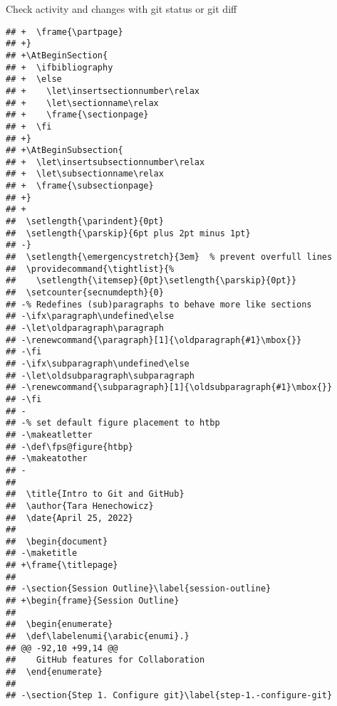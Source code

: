 \documentclass[ignorenonframetext,]{beamer}
\newif\ifbibliography
\let\insertsectionnumber\relax
\let\sectionname\relax
\let\insertsubsectionnumber\relax
\let\subsectionname\relax
\providecommand{\tightlist}{%
  \setlength{\itemsep}{0pt}\setlength{\parskip}{0pt}}
\begin{document}
\begin{frame}[fragile]{Check activity and changes with git status or git
diff}
\begin{verbatim}
## +  \frame{\partpage}
## +}
## +\AtBeginSection{
## +  \ifbibliography
## +  \else
## +    \let\insertsectionnumber\relax
## +    \let\sectionname\relax
## +    \frame{\sectionpage}
## +  \fi
## +}
## +\AtBeginSubsection{
## +  \let\insertsubsectionnumber\relax
## +  \let\subsectionname\relax
## +  \frame{\subsectionpage}
## +}
## +
##  \setlength{\parindent}{0pt}
##  \setlength{\parskip}{6pt plus 2pt minus 1pt}
## -}
##  \setlength{\emergencystretch}{3em}  % prevent overfull lines
##  \providecommand{\tightlist}{%
##    \setlength{\itemsep}{0pt}\setlength{\parskip}{0pt}}
##  \setcounter{secnumdepth}{0}
## -% Redefines (sub)paragraphs to behave more like sections
## -\ifx\paragraph\undefined\else
## -\let\oldparagraph\paragraph
## -\renewcommand{\paragraph}[1]{\oldparagraph{#1}\mbox{}}
## -\fi
## -\ifx\subparagraph\undefined\else
## -\let\oldsubparagraph\subparagraph
## -\renewcommand{\subparagraph}[1]{\oldsubparagraph{#1}\mbox{}}
## -\fi
## -
## -% set default figure placement to htbp
## -\makeatletter
## -\def\fps@figure{htbp}
## -\makeatother
## -
##  
##  \title{Intro to Git and GitHub}
##  \author{Tara Henechowicz}
##  \date{April 25, 2022}
##  
##  \begin{document}
## -\maketitle
## +\frame{\titlepage}
##  
## -\section{Session Outline}\label{session-outline}
## +\begin{frame}{Session Outline}
##  
##  \begin{enumerate}
##  \def\labelenumi{\arabic{enumi}.}
## @@ -92,10 +99,14 @@
##    GitHub features for Collaboration
##  \end{enumerate}
##  
## -\section{Step 1. Configure git}\label{step-1.-configure-git}

\end{verbatim}
\end{frame}
\end{document}
